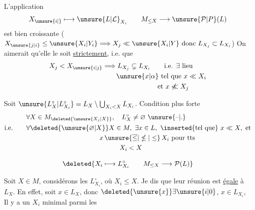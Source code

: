  L'application
\[
 X_{\unsure{i|{}}}\longmapsto\unsure{L|\mathcal{L}}_{X_i}\qquad
 M_{\leq X}\longrightarrow\unsure{\mathcal P|P}(L)
\]
est bien  croissante ($X_{\unsure{j|i}}\leq \unsure{X_i|Y_i}\Longrightarrow X_j\ll \unsure{X_i|Y}\text{ donc }L_{X_j}\subset L_{X_i}$) On aimerait qu'elle le soit \uline{strictement}, i.e. que 
\[
\begin{aligned}
 X_j<X_{\unsure{i|j}}&\Longrightarrow L_{X_j}\subsetneq L_{X_i}\qquad\text{i.e. }\exists\ \text{lieu}\\
 &\qquad \unsure{x|\alpha}\ \text{tel que }x\ll X_i\\
 &\hspace{8em}\text{et }x\not\ll X_j
\end{aligned}
\]

 Soit $\unsure{L_X^{\circ}|L_{X_i}^{\circ}}=L_X\setminus\bigcup_{X_i<X}L_{X_i}$. Condition plus forte
\[
\begin{aligned}
 &\forall X\in M_{\deleted{\unsure{X_j|X}}},\quad L_X^{\circ}\ne\varnothing\ \unsure{\text{--}|.}\\
 \text{i.e.}\qquad &\forall\deleted{\unsure{\varnothing|X}}X\in M,\ \exists x\in L,\ \inserted{\text{tel que}}\ x\ll X,\ \text{et}\\
 &\hspace{11em}x\,\unsure{\overline{\leq}|\nleq|\leq}\,X_i\ \text{pour tts}\\
 &\hspace{14em}X_i<X
\end{aligned}
\]

\[
 \deleted{X_i\longmapsto L_{X_i}^{\circ}\qquad M_{\leq X}\longrightarrow\mathcal P(L)}
\]

Soit $X\in M$, considérons les $L_{X_i}^{\circ}$, où $X_i\leq X$. Je dis que leur réunion  est \uline{égale} à $L_X$. En effet, soit $x\in L_X$, donc $\deleted{\unsure{x}}\exists\unsure{i|0}$, $x\in L_{X_i}$,  Il y a un $X_i$ minimal parmi les
